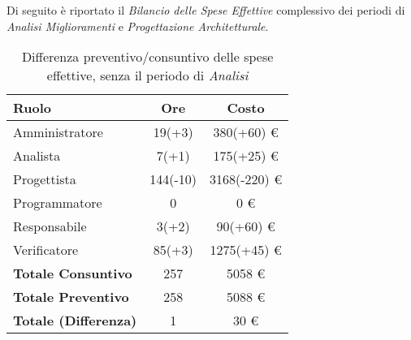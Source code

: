 Di seguito è riportato il \textit{Bilancio delle Spese Effettive} complessivo dei periodi di \textit{Analisi Miglioramenti} e \textit{Progettazione Architetturale}.

\begin{table}[H]
	\centering
	\begin{tabular}{ l c c }
		\textbf{Ruolo} & \textbf{Ore} & \textbf{Costo} \\
		\hline
		Amministratore & 19(+3) & 380(+60) \euro{} \\
		Analista & 7(+1) & 175(+25) \euro{} \\
		Progettista & 144(-10) & 3168(-220) \euro{} \\
		Programmatore & 0 & 0 \euro{} \\
		Responsabile & 3(+2) & 90(+60) \euro{} \\
		Verificatore & 85(+3) & 1275(+45) \euro{} \\
		\hline
		\textbf{Totale Consuntivo} & 257 & 5058 \euro{} \\
		\hline
		\textbf{Totale Preventivo} & 258 & 5088 \euro{} \\
		\hline
		\textbf{Totale (Differenza)} & 1 & 30 \euro{} \\
		\hline
	\end{tabular}
	\caption{Differenza preventivo/consuntivo delle spese effettive, senza il periodo di \textit{Analisi}}
\end{table}

\newpage